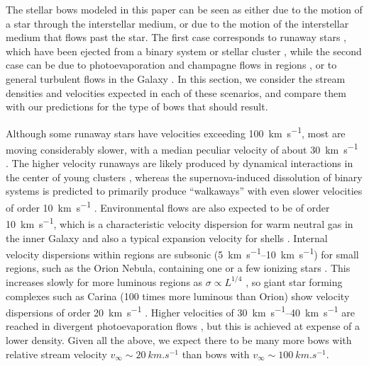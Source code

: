 The stellar bows modeled in this paper can be seen as either due to
the motion of a star through the interstellar medium, or due to the
motion of the interstellar medium that flows past the star.  The
first case corresponds to runaway stars \citep{Blaauw:1961a}, which
have been ejected from a binary system or stellar cluster
\citep{Hoogerwerf:2001a}, while the second case can be due to
photoevaporation and champagne flows in \hii{} regions
\citep{Tenorio-Tagle:1979a, Shu:2002a, Henney:2005a}, or to general
turbulent flows in the Galaxy
\citep[e.g.,][]{Ballesteros-Paredes:1999a}.  In this section, we
consider the stream densities and velocities expected in each of these
scenarios, and compare them with our predictions for the type of bows
that should result.

Although some runaway stars have velocities exceeding
\SI{100}{km.s^{-1}}, most are moving considerably slower, with a
median peculiar velocity of about \SI{30}{km.s^{-1}}
\citep{Tetzlaff:2011a}.  The higher velocity runaways are likely
produced by dynamical interactions in the center of young clusters
\citep{Gualandris:2004a}, whereas the supernova-induced dissolution of
binary systems is predicted to primarily produce ``walkaways'' with
even slower velocities of order \SI{10}{km.s^{-1}}
\citep{Renzo:2018a}.  Environmental flows are also expected to be of
order \SI{10}{km.s^{-1}}, which is a characteristic velocity
dispersion for warm neutral gas in the inner Galaxy
\citep{Marasco:2017a} and also a typical expansion velocity for
 shells \citep{Ehlerova:2005a}.  Internal velocity
dispersions within \hii{} regions are subsonic
(\SIrange{5}{10}{km.s^{-1}}) for small regions, such as the Orion
Nebula, containing one or a few ionizing stars
\citep{Arthur:2016a}. This increases slowly for more luminous regions
as \(\sigma \propto L^{1/4}\) \citep{Bordalo:2011a}, so giant star forming
complexes such as Carina (100 times more luminous than Orion) show
velocity dispersions of order \SI{20}{km.s^{-1}}
\citep{Damiani:2016a}.  Higher velocities of
\SIrange{30}{40}{km.s^{-1}} are reached in divergent photoevaporation
flows \citep{Dyson:1968a}, but this is achieved at expense of a lower
density.  Given all the above, we expect there to be many more bows
with relative stream velocity \(v_\infty \sim \SI{20}{km.s^{-1}}\) than bows
with \(v_\infty \sim \SI{100}{km.s^{-1}}\).

